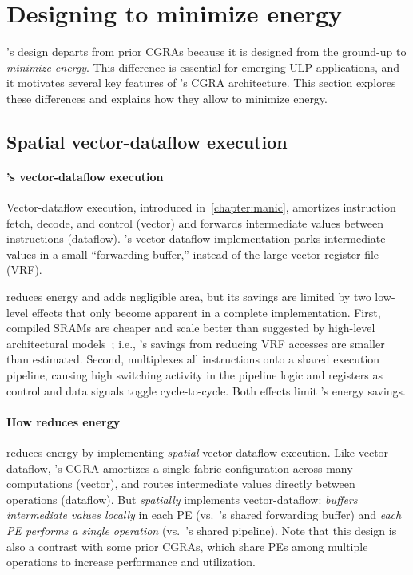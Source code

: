\section{Designing \snafuframe to minimize energy}
\label{snafu:energy}

\snafuframe's design departs from prior CGRAs because it is designed from the ground-up to \emph{minimize energy}.
This difference is essential for emerging ULP applications,
and it motivates several key features of \snafuframe's CGRA architecture.
%
This section explores these differences and explains how they allow \snafuframe to minimize energy.

\subsection{Spatial vector-dataflow execution}

\paragraph{\manic's vector-dataflow execution}
Vector-dataflow execution, introduced in~\autoref{chapter:manic}, amortizes instruction fetch, decode, and control (vector)
and forwards intermediate values between instructions (dataflow).
% 
\manic's vector-dataflow implementation parks intermediate values in a small ``forwarding buffer,'' instead of the large vector register file (VRF).

\manic reduces energy and adds negligible area,
but its savings are limited by two low-level effects that only become apparent in a complete implementation.
First, compiled SRAMs are cheaper and scale better than
suggested by high-level architectural models~\cite{cacti,destiny};
i.e., \manic's savings from reducing VRF accesses are smaller than estimated.
Second, \manic multiplexes all instructions onto a shared execution pipeline,
causing high switching activity in the pipeline logic and registers as control and data signals toggle cycle-to-cycle.
Both effects limit \manic's energy savings.

\paragraph{How \snafu reduces energy}
%
\snafuframe reduces energy by implementing \emph{spatial} vector-dataflow
execution.
%
Like vector-dataflow,
\snafuframe's CGRA amortizes a single fabric configuration across many computations (vector),
and routes intermediate values directly between operations (dataflow).
%
But \snafuframe \emph{spatially} implements vector-dataflow:
\snafuframe \emph{buffers intermediate values locally} in each PE (vs.\ \manic's shared forwarding buffer)
and \emph{each PE performs a single operation} (vs.\ \manic's shared pipeline).
%
Note that this design is also a contrast with some prior CGRAs, which share PEs among
multiple operations to increase performance and utilization.

